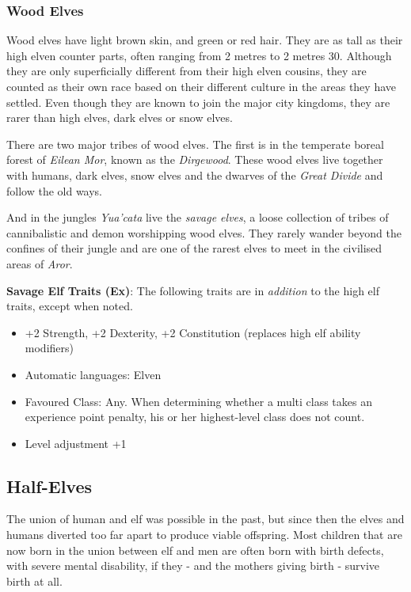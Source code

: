 \subsubsection*{Wood Elves}

Wood elves have light brown skin, and green or red hair. They are as tall as
their high elven counter parts, often ranging from 2 metres to 2 metres
30. Although they are only superficially different from their high elven
cousins, they are counted as their own race based on their different culture
in the areas they have settled. Even though they are known to join the major
city kingdoms, they are rarer than high elves, dark elves or snow elves.

There are two major tribes of wood elves. The first is in the temperate boreal
forest of \emph{Eilean Mor}, known as the \emph{Dirgewood}. These wood elves
live together with humans, dark elves, snow elves and the dwarves of the
\emph{Great Divide} and follow the old ways.

And in the jungles \emph{Yua'cata} live the \emph{savage elves}, a loose
collection of tribes of cannibalistic and demon worshipping wood elves. They
rarely wander beyond the confines of their jungle and are one of the rarest
elves to meet in the civilised areas of \emph{Aror}.

\begin{35e}
  \textbf{Savage Elf Traits (Ex)}: The following traits are in \emph{addition}
  to the high elf traits, except when noted.
  \begin{itemize}[noitemsep]
    \item +2 Strength, +2 Dexterity, +2 Constitution (replaces high elf ability
    modifiers)
    \item Automatic languages: Elven
    \item Favoured Class: Any. When determining whether a multi class takes an
    experience point penalty, his or her highest-level class does not count.
    \item Level adjustment +1
  \end{itemize}
\end{35e}

\subsection*{Half-Elves}

The union of human and elf was possible in the past, but since then the elves
and humans diverted too far apart to produce viable offspring. Most children
that are now born in the union between elf and men are often born with birth
defects, with severe mental disability, if they - and the mothers giving
birth - survive birth at all.

